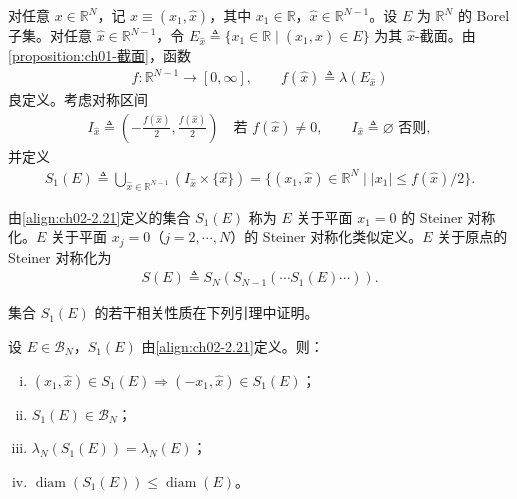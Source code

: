 \documentclass[../../main.tex]{subfiles}%
\begin{document}
对任意 $x\in\mathbb R^N$，记 $x\equiv(x_1,\hat x)$，其中 $x_1\in\mathbb R$，$\hat x\in\mathbb R^{N-1}$。设 $E$ 为 $\mathbb R^N$ 的 Borel 子集。对任意 $\hat x\in\mathbb R^{N-1}$，令 $E_{\hat x}\triangleq \{x_1\in\mathbb R\mid(x_1,\hat x)\in E\}$ 为其 $\hat x$-截面。由\cref{proposition:ch01-截面}，函数
\begin{align}
f:\mathbb R^{N-1}\to[0,\infty],\qquad f(\hat x)\triangleq \lambda(E_{\hat x}) \label{align:ch02-2.20}
\end{align}
良定义。考虑对称区间
\begin{align*}
I_{\hat x}\triangleq \left(-\frac{f(\hat x)}2,\frac{f(\hat x)}2\right)\quad\text{若 }f(\hat x)\neq0,\qquad I_{\hat x}\triangleq \varnothing \text{ 否则},
\end{align*}
并定义
\begin{align}
S_1(E)\triangleq \bigcup_{\hat x\in\mathbb R^{N-1}}(I_{\hat x}\times\{\hat x\})
=\{(x_1,\hat x)\in\mathbb R^N\mid|x_1|\leqslant f(\hat x)/2\}. \label{align:ch02-2.21}
\end{align}

\begin{definition}\label{definition:ch02-Steiner对称化}
由\eqref{align:ch02-2.21}定义的集合 $S_1(E)$ 称为 $E$ 关于平面 $x_1=0$ 的 Steiner 对称化。$E$ 关于平面 $x_j=0$（$j=2,\cdots ,N$）的 Steiner 对称化类似定义。$E$ 关于原点的 Steiner 对称化为
\begin{align}
S(E)\triangleq S_N(S_{N-1}(\cdots S_1(E)\cdots)). \label{align:ch02-2.22}
\end{align}
\end{definition}

集合 $S_1(E)$ 的若干相关性质在下列引理中证明。

\begin{lemma}\label{lemma:ch02-Steiner性质}
设 $E\in\mathscr B_N$，$S_1(E)$ 由\eqref{align:ch02-2.21}定义。则：
\begin{enumerate}[(i)]
\item $(x_1,\hat x)\in S_1(E)\Rightarrow(-x_1,\hat x)\in S_1(E)$；
\item $S_1(E)\in\mathscr B_N$；
\item $\lambda_N(S_1(E))=\lambda_N(E)$；
\item $\operatorname{diam}(S_1(E))\leqslant\operatorname{diam}(E)$。
\end{enumerate}
\end{lemma}
\end{document}
